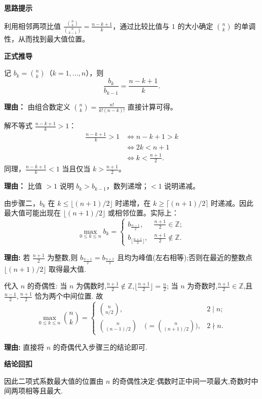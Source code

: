 \begin{proofbox}
	\textbf{\textcolor{CProof}{思路提示}}

	利用相邻两项比值 $\frac{\binom{n}{k}}{\binom{n}{k-1}} = \frac{n-k+1}{k}$，通过比较比值与 $1$ 的大小确定 $\binom{n}{k}$ 的单调性，从而找到最大值位置。

	\medskip
	\textbf{\textcolor{CProof}{正式推导}}
	\begin{description}[style=nextline, leftmargin=2.8em, labelsep=0.5em, itemsep=0.55em]
		\item[\textbf{步骤一（比值表达式）：}]
			记 $b_k = \binom{n}{k}$（$k=1,\dots,n$），则
			\[
				\frac{b_k}{b_{k-1}} = \frac{n-k+1}{k}.
			\]
			\par\textbf{理由：}
			由组合数定义 $\binom{n}{k} = \frac{n!}{k!(n-k)!}$ 直接计算可得。

		\item[\textbf{步骤二（单调区间判定）：}]
			解不等式 $\frac{n-k+1}{k} > 1$：
			\[
				\begin{aligned}
					\frac{n-k+1}{k} > 1
					&\Longleftrightarrow n-k+1 > k \\
					&\Longleftrightarrow 2k < n+1 \\
					&\Longleftrightarrow k < \frac{n+1}{2}.
			\end{aligned}
			\]
			同理，$\frac{n-k+1}{k} < 1$ 当且仅当 $k > \frac{n+1}{2}$。
			\par\textbf{理由：}
			比值 $>1$ 说明 $b_k > b_{k-1}$，数列递增；$<1$ 说明递减。

		\item[\textbf{步骤三（极大点定位）：}]
			由步骤二，$b_k$ 在 $k \le \lfloor (n+1)/2 \rfloor$ 时递增，在 $k \ge \lceil (n+1)/2\rceil$ 时递减。因此最大值可能出现在 $\lfloor (n+1)/2\rfloor$ 或相邻位置。实际上：
			\[
				\max_{0\le k\le n} b_k =
				\begin{cases}
					b_{\frac{n-1}{2}}, & \frac{n+1}{2}\in\mathbb{Z};\\[4pt]
					b_{\lfloor \frac{n+1}{2}\rfloor}, & \frac{n+1}{2}\notin\mathbb{Z}.
			\end{cases}
			\]
			\par\textbf{理由:}
			若 $\frac{n+1}{2}$ 为整数,则 $b_{\frac{n-1}{2}}=b_{\frac{n+1}{2}}$ 且均为峰值(左右相等);否则在最近的整数点 $\lfloor (n+1)/2\rfloor$ 取得最大值.

		\item[\textbf{步骤四(奇偶分类得结果):}]
			代入 $n$ 的奇偶性:
			当 $n$ 为偶数时,$\frac{n+1}{2}\notin\mathbb{Z}$,$\lfloor\frac{n+1}{2}\rfloor = \frac{n}{2}$;
			当 $n$ 为奇数时,$\frac{n+1}{2}\in\mathbb{Z}$,且 $\frac{n-1}{2},\frac{n+1}{2}$ 恰为两个中间位置.
			故
			\[
				\max_{0\le k\le n} \binom{n}{k} =
				\begin{cases}
					\displaystyle \binom{n}{n/2}, & 2\mid n;\\[8pt]
					\displaystyle \binom{n}{(n-1)/2} \quad \bigl(=\binom{n}{(n+1)/2}\bigr), & 2\nmid n.
			\end{cases}
			\]
			\par\textbf{理由:}
			直接将 $n$ 的奇偶代入步骤三的结论即可.
	\end{description}

	\medskip
	\textbf{\textcolor{CProof}{结论回扣}}

	因此二项式系数最大值的位置由 $n$ 的奇偶性决定:偶数时正中间一项最大,奇数时中间两项相等且最大.
\end{proofbox}
